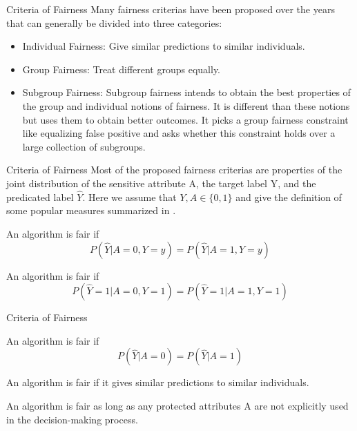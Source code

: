 \documentclass[10pt, xcolor=table,aspectratio=169]{beamer}
\begin{document}
\begin{frame}{Criteria of Fairness}
	Many fairness criterias have been proposed over the years that can generally be divided into three categories:
	\begin{itemize}
		\item Individual Fairness: Give similar predictions to similar individuals.
		\item Group Fairness: Treat different groups equally.
		\item Subgroup Fairness: Subgroup fairness intends to obtain the best properties of the group	and individual notions of fairness. It is different than these notions but uses them to obtain better outcomes. It picks a group fairness constraint like equalizing false positive and asks whether this constraint holds over a large collection of subgroups.
	\end{itemize}

\end{frame}
\begin{frame}{Criteria of Fairness}
	Most of the proposed fairness criterias are properties of the joint distribution of the sensitive attribute A, the target label Y, and the	predicated label $\hat{Y}$. Here we assume that $Y, A\in \{0,1\}$ and give the definition of some popular measures summarized in \cite{mehrabi2021survey}.
	\begin{definition}
		An algorithm is fair if
		$$ P(\hat{Y}|A=0,Y=y)=P(\hat{Y}|A=1,Y=y)$$
	\end{definition}
	\begin{definition}
		An algorithm is fair if
		$$ P(\hat{Y}=1|A=0,Y=1)=P(\hat{Y}=1|A=1,Y=1)$$
	\end{definition}

\end{frame}

\begin{frame}{Criteria of Fairness}
	\begin{definition}
		An algorithm is fair if
		$$ P(\hat{Y}|A=0)=P(\hat{Y}|A=1)$$
	\end{definition}
	\begin{definition}
		An algorithm is fair if it gives similar predictions to
		similar individuals.
	\end{definition}

	\begin{definition}
		An algorithm is fair as long as any protected attributes
		A are not explicitly used in the decision-making process.
	\end{definition}

\end{frame}
\end{document}
